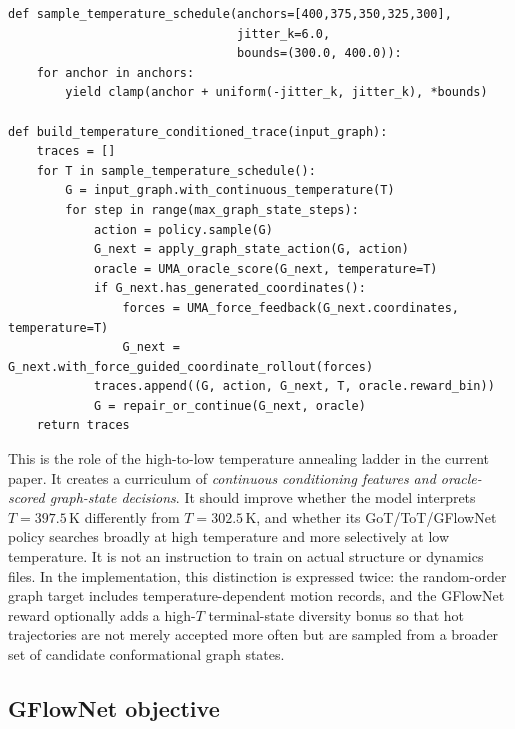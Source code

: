 \documentclass[11pt]{article}
\newcommand{\1}{\mathbf{1}}
\begin{document}
\begin{lstlisting}[caption={Continuous-temperature UMA-oracle graph-state curriculum.}]
def sample_temperature_schedule(anchors=[400,375,350,325,300],
                                jitter_k=6.0,
                                bounds=(300.0, 400.0)):
    for anchor in anchors:
        yield clamp(anchor + uniform(-jitter_k, jitter_k), *bounds)

def build_temperature_conditioned_trace(input_graph):
    traces = []
    for T in sample_temperature_schedule():
        G = input_graph.with_continuous_temperature(T)
        for step in range(max_graph_state_steps):
            action = policy.sample(G)
            G_next = apply_graph_state_action(G, action)
            oracle = UMA_oracle_score(G_next, temperature=T)
            if G_next.has_generated_coordinates():
                forces = UMA_force_feedback(G_next.coordinates, temperature=T)
                G_next = G_next.with_force_guided_coordinate_rollout(forces)
            traces.append((G, action, G_next, T, oracle.reward_bin))
            G = repair_or_continue(G_next, oracle)
    return traces
\end{lstlisting}

This is the role of the high-to-low temperature annealing ladder in the current paper. It creates a curriculum of \emph{continuous conditioning features and oracle-scored graph-state decisions}. It should improve whether the model interprets \(T=397.5\,\mathrm K\) differently from \(T=302.5\,\mathrm K\), and whether its GoT/ToT/GFlowNet policy searches broadly at high temperature and more selectively at low temperature. It is not an instruction to train on actual structure or dynamics files. In the implementation, this distinction is expressed twice: the random-order graph target includes temperature-dependent motion records, and the GFlowNet reward optionally adds a high-\(T\) terminal-state diversity bonus so that hot trajectories are not merely accepted more often but are sampled from a broader set of candidate conformational graph states.

\subsection{GFlowNet objective}
\end{document}
